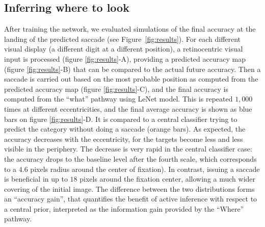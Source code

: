 \subsection{Inferring where to look}
\fi
After training the network, we evaluated simulations of the final accuracy at the landing of the predicted saccade (see Figure~\ref{fig:results}). For each different visual display (a different digit at a different position), a retinocentric visual input is processed (figure \ref{fig:results}-A), providing a predicted accuracy map (figure \ref{fig:results}-B) that can be compared to the actual future accuracy. Then a saccade is carried out based on the most probable position as computed from the predicted accuracy map (figure \ref{fig:results}-C), and the final accuracy is computed from the ``what'' pathway using LeNet model. This is repeated $1,000$ times at different eccentricities, and the final average accuracy is shown as blue bars on figure \ref{fig:results}-D. It is compared to a central classifier trying to predict the category without doing a saccade (orange bars). As expected, the accuracy decreases with the eccentricity, for the targets become less and less visible in the periphery. The decrease is very rapid in the central classifier case: the accuracy drops to the baseline level %
after the fourth scale, which corresponds to a $4.6$ pixels radius around the center of fixation). In contrast, issuing a saccade is beneficial in up to $18$ pixels around the fixation center, allowing a much wider covering of the initial image. The difference between the two distributions forms an ``accuracy gain'', that quantifies the benefit of active inference with respect to a central prior, interpreted as the information gain provided by the ``Where'' pathway.
\ICANN


